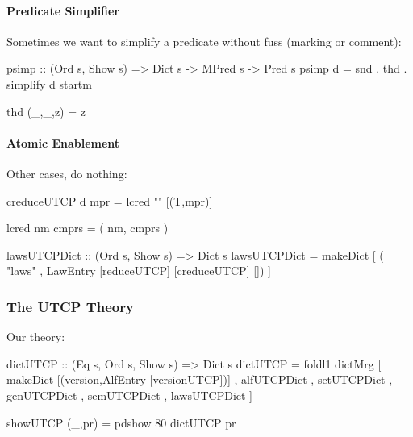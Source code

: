 \paragraph{Predicate Simplifier}
 Sometimes we want to simplify a predicate without fuss
(marking or comment):
\begin{code}
psimp :: (Ord s, Show s)
      => Dict s -> MPred s -> Pred s
psimp d = snd . thd . simplify d startm

thd (_,_,z) = z
\end{code}


\paragraph{Atomic Enablement}



Other cases, do nothing:
\begin{code}
creduceUTCP d mpr = lcred "" [(T,mpr)]

lcred nm cmprs = ( nm, cmprs )
\end{code}


\begin{code}
lawsUTCPDict :: (Ord s, Show s) => Dict s
lawsUTCPDict
 = makeDict
    [ ( "laws"
      , LawEntry [reduceUTCP] [creduceUTCP] [])
    ]
\end{code}






\subsubsection{The UTCP Theory}
Our theory:
\begin{code}
dictUTCP :: (Eq s, Ord s, Show s) => Dict s
dictUTCP
 = foldl1 dictMrg [ makeDict [(version,AlfEntry [versionUTCP])]
                  , alfUTCPDict
                  , setUTCPDict
                  , genUTCPDict
                  , semUTCPDict
                  , lawsUTCPDict
                  ]

showUTCP (_,pr)  = pdshow 80 dictUTCP pr
\end{code}
